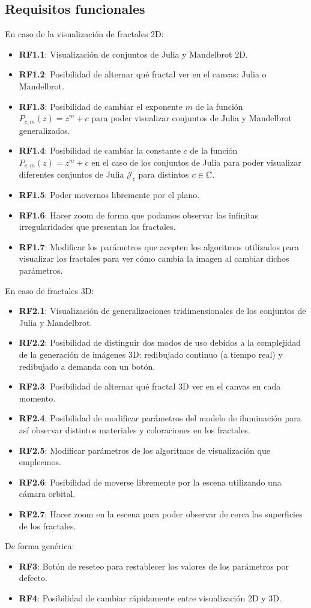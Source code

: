 \subsection{Requisitos funcionales}
En caso de la visualización de fractales 2D:
\begin{itemize}
    \item \textbf{RF1.1}: Visualización de conjuntos de Julia y Mandelbrot 2D.
    \item \textbf{RF1.2}: Posibilidad de alternar qué fractal ver en el canvas: Julia o Mandelbrot.
    \item \textbf{RF1.3}: Posibilidad de cambiar el exponente $m$ de la función $P_{c,m}(z)=z^m+c$ para poder visualizar conjuntos de Julia y Mandelbrot generalizados.
    \item \textbf{RF1.4}: Posibilidad de cambiar la constante $c$ de la función $P_{c,m}(z)=z^m+c$ en el caso de los conjuntos de Julia para poder visualizar diferentes conjuntos de Julia $\mathcal{J}_c$ para distintos $c\in\mathbb{C}$.
    \item \textbf{RF1.5}: Poder movernos libremente por el plano.
    \item \textbf{RF1.6}: Hacer zoom de forma que podamos observar las infinitas irregularidades que presentan los fractales.
    \item \textbf{RF1.7}: Modificar los parámetros que acepten los algoritmos utilizados para visualizar los fractales para ver cómo cambia la imagen al cambiar dichos parámetros.
\end{itemize}
En caso de fractales 3D:
\begin{itemize}
    \item \textbf{RF2.1}: Visualización de generalizaciones tridimensionales de los conjuntos de Julia y Mandelbrot.
    \item \textbf{RF2.2}: Posibilidad de distinguir dos modos de uso debidos a la complejidad de la generación de imágenes 3D: redibujado continuo (a tiempo real) y redibujado a demanda con un botón.
    \item \textbf{RF2.3}: Posibilidad de alternar qué fractal 3D ver en el canvas en cada momento.
    \item \textbf{RF2.4}: Posibilidad de modificar parámetros del modelo de iluminación para así observar distintos materiales y coloraciones en los fractales.
    \item \textbf{RF2.5}: Modificar parámetros de los algoritmos de visualización que empleemos.
    \item \textbf{RF2.6}: Posibilidad de moverse libremente por la escena utilizando una cámara orbital.
    \item \textbf{RF2.7}: Hacer zoom en la escena para poder observar de cerca las superficies de los fractales.
\end{itemize}
De forma genérica:
\begin{itemize}
    \item \textbf{RF3}: Botón de reseteo para restablecer los valores de los parámetros por defecto.
    \item \textbf{RF4}: Posibilidad de cambiar rápidamente entre visualización 2D y 3D.
\end{itemize}

